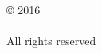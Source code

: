 
\thispagestyle{empty} %
\null\vfill %
\begin{center}
  \SingleSpace %
© 2016\\
[Matthew D Anthony]\\
All rights reserved\\
\end{center}
